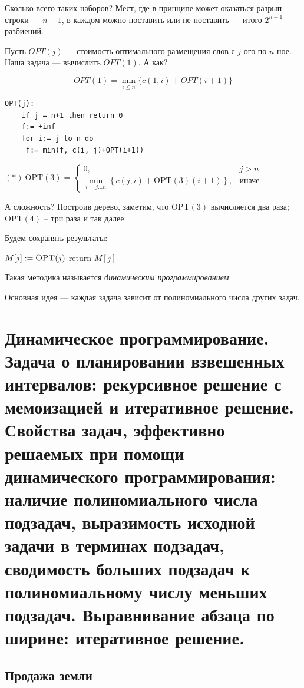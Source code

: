 \documentclass[a4paper,12pt]{article}
\begin{document}
Сколько всего таких наборов? Мест, где в принципе может оказаться разрып строки --- $n-1$, в каждом можно поставить или не поставить --- итого $2^{n-1}$ разбиений.

Пусть $OPT(j)$ --- стоимость оптимального размещения слов с $j$-ого по $n$-ное. Наша задача --- вычислить $OPT(1)$. А как?

\[
    OPT(1) = \min\limits_{i\leqslant n}\{c(1, i)+OPT(i+1)\}
\]

\begin{lstlisting}
OPT(j):
    if j = n+1 then return 0
    f:= +inf
    for i:= j to n do
     f:= min(f, c(i, j)+OPT(i+1))
\end{lstlisting}

$(*)\ \mathrm{OPT}(3) =\begin{cases}
    0, & j>n\\
    \min\limits_{i = j\ldots n}\left\{ c(j, i) + \mathrm{OPT}(3)(i+1) \right\}, & \text{иначе}
\end{cases}$

А сложность? Построив дерево, заметим, что $\mathrm{OPT}(3)$ вычисляется два раза; $\mathrm{OPT}(4)$ -- три раза и так далее.

Будем сохранять результаты:

\begin{algorithmic}
	\Else
		\State \(M[j] \mathrel{:=} \textsc{OPT}(j)\)
	\EndIf
	\State return \(M[j]\)
	\EndFunction
\end{algorithmic}

Такая методика называется \emph{динамическим программированием}.

Основная идея --- каждая задача зависит от полиномиального числа других задач.
\newpage
\section{Динамическое программирование. Задача о планировании взвешенных интервалов: рекурсивное решение с мемоизацией и итеративное решение. Свойства задач, эффективно решаемых при помощи динамического программирования: наличие полиномиального числа подзадач, выразимость исходной задачи в терминах подзадач, сводимость больших подзадач к полиномиальному числу меньших подзадач. Выравнивание абзаца по ширине: итеративное решение.}

\subsection{Продажа земли}
\end{document}

